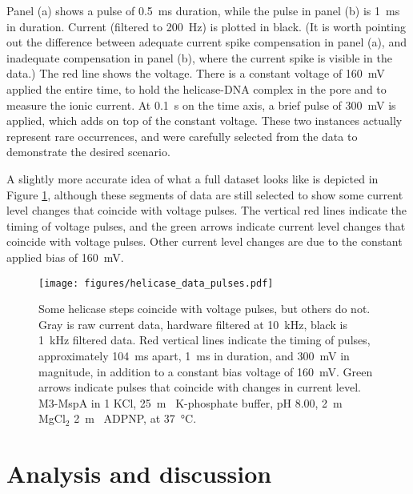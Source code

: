 Panel (a) shows a pulse of \SI{0.5}{\ms} duration, while the pulse in panel (b) is \SI{1}{\ms} in duration.  Current (filtered to \SI{200}{\Hz}) is plotted in black.  (It is worth pointing out the difference between adequate current spike compensation in panel (a), and inadequate compensation in panel (b), where the current spike is visible in the data.)  The red line shows the voltage.  There is a constant voltage of \SI{160}{\mV} applied the entire time, to hold the helicase-DNA complex in the pore and to measure the ionic current.  At \SI{0.1}{\s} on the time axis, a brief pulse of \SI{300}{\mV} is applied, which adds on top of the constant voltage.  These two instances actually represent rare occurrences, and were carefully selected from the data to demonstrate the desired scenario.

A slightly more accurate idea of what a full dataset looks like is depicted in Figure \ref{fig:helicase_pulse_traces}, although these segments of data are still selected to show some current level changes that coincide with voltage pulses.  The vertical red lines indicate the timing of voltage pulses, and the green arrows indicate current level changes that coincide with voltage pulses.  Other current level changes are due to the constant applied bias of \SI{160}{\mV}.

\begin{figure}[h]
\begin{centering}
\texttt{[image: figures/helicase\_data\_pulses.pdf]}
\caption[A fraction of pulses move the helicase]{Some helicase steps coincide with voltage pulses, but others do not.  Gray is raw current data, hardware filtered at \SI{10}{\kHz}, black is \SI{1}{\kHz} filtered data.  Red vertical lines indicate the timing of pulses, approximately \SI{104}{\ms} apart, \SI{1}{\ms} in duration, and \SI{300}{\mV} in magnitude, in addition to a constant bias voltage of \SI{160}{\mV}.  Green arrows indicate pulses that coincide with changes in current level. M3-MspA in \SI{1}{\Molar} KCl, \SI{25}{\m\Molar} K-phosphate buffer, pH \num{8.00}, \SI{2}{\m\Molar} MgCl$_2$ \SI{2}{\m\Molar} ADPNP, at \SI{37}{\celsius}.}
\label{fig:helicase_pulse_traces}
\end{centering}
\end{figure}

\section{Analysis and discussion}

